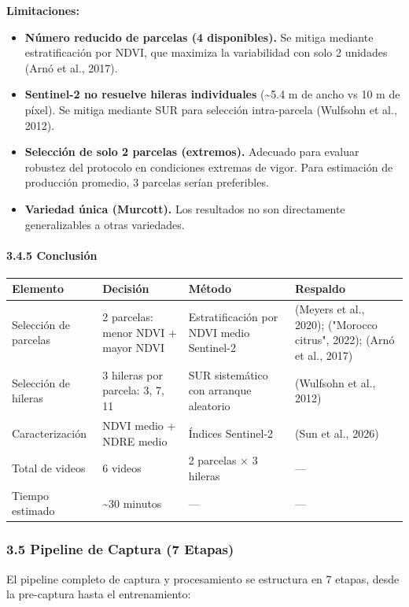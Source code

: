 \textbf{Limitaciones:}

\begin{itemize}
\item \textbf{Número reducido de parcelas (4 disponibles).} Se mitiga mediante estratificación por NDVI, que maximiza la variabilidad con solo 2 unidades (Arnó et al., 2017).
\item \textbf{Sentinel-2 no resuelve hileras individuales} (\textasciitilde{}5.4 m de ancho vs 10 m de píxel). Se mitiga mediante SUR para selección intra-parcela (Wulfsohn et al., 2012).
\item \textbf{Selección de solo 2 parcelas (extremos).} Adecuado para evaluar robustez del protocolo en condiciones extremas de vigor. Para estimación de producción promedio, 3 parcelas serían preferibles.
\item \textbf{Variedad única (Murcott).} Los resultados no son directamente generalizables a otras variedades.
\end{itemize}

\paragraph{3.4.5 Conclusión}



\begin{tabular}{llll}
\hline
Elemento & Decisión & Método & Respaldo \\
\hline
Selección de parcelas & 2 parcelas: menor NDVI + mayor NDVI & Estratificación por NDVI medio Sentinel-2 & (Meyers et al., 2020); ("Morocco citrus", 2022); (Arnó et al., 2017) \\
Selección de hileras & 3 hileras por parcela: 3, 7, 11 & SUR sistemático con arranque aleatorio & (Wulfsohn et al., 2012) \\
Caracterización & NDVI medio + NDRE medio & Índices Sentinel-2 & (Sun et al., 2026) \\
Total de videos & 6 videos & 2 parcelas × 3 hileras & — \\
Tiempo estimado & \textasciitilde{}30 minutos & — & — \\
\hline
\end{tabular}


\subsubsection{3.5 Pipeline de Captura (7 Etapas)}


El pipeline completo de captura y procesamiento se estructura en 7 etapas, desde la pre-captura hasta el entrenamiento:


